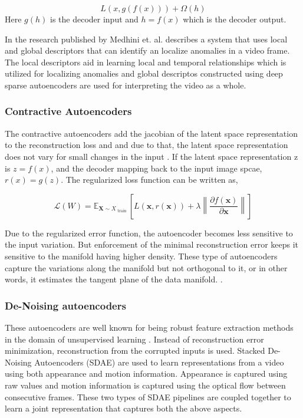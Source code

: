 \documentclass[a4paper,12pt]{report}
\begin{document}
\begin{itemize}
\begin{equation}
    L(x, g(f(x))) + \Omega(h)
\end{equation}
Here $g(h)$ is the decoder input and $h = f(x)$ which is the decoder output.

In the research published by Medhini et. al. \cite{sparse} describes a system that uses local and global descriptors that can identify an localize anomalies in a video frame. The local descriptors aid in learning local and temporal relationships which is utilized for localizing anomalies and global descriptos constructed using deep sparse autoencoders are used for interpreting the video as a whole. 



\subsubsection{Contractive Autoencoders}

The contractive autoencoders add the jacobian of the latent space representation to the reconstruction loss and and due to that, the latent space representation does not vary for small changes in the input \cite{Rifai:2011:CAE:3104482.3104587}. If the latent space representation z is $z = f(x)$, and the decoder mapping back to the input image spcae, $r(x) = g(z)$. The regularized loss function can be written as,

\begin{equation}
    \mathscr { L } ( W ) = \mathbb { E } _ { \mathbf { X } \sim X _ { \text { train } } } \left[ L ( \mathbf { x } , r ( \mathbf { x } ) ) + \lambda \left\| \frac { \partial f ( \mathbf { x } ) } { \partial \mathbf { x } } \right\| \right]
\end{equation}

Due to the regularized error function, the autoencoder becomes less sensitive to the input variation. But enforcement of the minimal reconstruction error keeps it sensitive to the manifold having higher density. These type of autoencoders capture the variations along the manifold but not orthogonal to it, or in other words, it estimates the tangent plane of the data manifold. \cite{22}.

\subsubsection{De-Noising autoencoders}
These autoencoders are well known for being robust feature extraction methods in the domain of unsupervised learning \cite{41}. Instead of reconstruction error minimization, reconstruction from the corrupted inputs is used. Stacked De-Noising Autoencoders (SDAE) are used to learn representations from a video using both appearance and motion information. Appearance is captured using raw values and motion information is captured using the optical flow between consecutive frames\cite{42}. These two types of SDAE pipelines are coupled together to learn a joint representation that captures both the above aspects.



\end{itemize}
\end{document}
